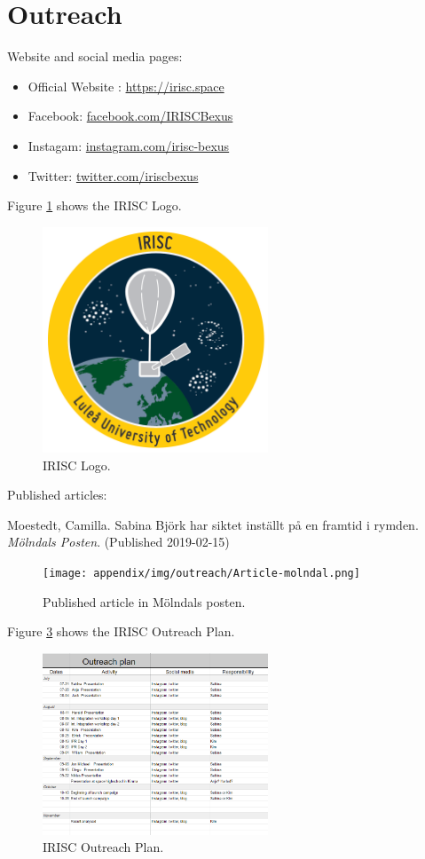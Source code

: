 \newpage
\section{Outreach} \label{sec:appB}

Website and social media pages: 

\begin{itemize}
	\item Official Website : \url{https://irisc.space}
	\item Facebook: \url{facebook.com/IRISCBexus}
	\item Instagam: \url{instagram.com/irisc-bexus}
	\item Twitter: \url{twitter.com/iriscbexus}
\end{itemize}

Figure \ref{fig:loggo} shows the IRISC Logo.

\begin{figure}[H]
	\centering
	\includegraphics[width=0.6\textwidth]{0-cover/img/logo-irisc.png}
	\caption{IRISC Logo.}
	\label{fig:loggo}
\end{figure}

Published articles: 

Moestedt, Camilla. Sabina Björk har siktet inställt på en framtid i rymden. \textit{Mölndals Posten}. (Published 2019-02-15)

\begin{figure}[H]
	\centering
	\texttt{[image: appendix/img/outreach/Article-molndal.png]}
	\caption{Published article in Mölndals posten.}
	\label{fig:outreachplan}
\end{figure}

Figure \ref{fig::outreachplan} shows the IRISC Outreach Plan.

\begin{figure}[H]
	\centering
	\includegraphics[width=0.6\textwidth]{appendix/img/outreach/Outreachplan.png}
	\caption{IRISC Outreach Plan.}
	\label{fig::outreachplan}
\end{figure}